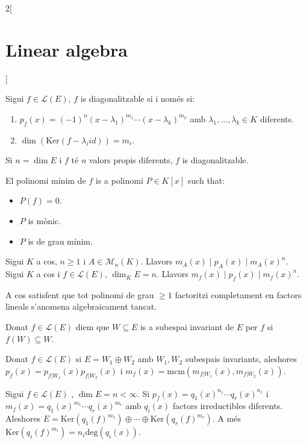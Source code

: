 \documentclass[../../../main.tex]{subfiles}
\begin{document}
\begin{multicols}{2}[\section{Linear algebra}]
\begin{theorem}
Sigui $f\in\mathcal{L}(E)$, $f$ is diagonalitzable si i només si:
\begin{enumerate}
    \item $p_f(x)=(-1)^n(x-\lambda_1)^{m_1}\cdots(x-\lambda_k)^{m_k}$ amb $\lambda_1,\ldots,\lambda_k\in K$ diferents.
    \item $\dim(\text{Ker}(f-\lambda_i id))=m_i$.
\end{enumerate}
\end{theorem}
\begin{corollary}
Si $n=\dim E$ i $f$ té $n$ valors propis diferents, $f$ is diagonalitzable.
\end{corollary}
\begin{definition}
El polinomi mínim de $f$ is a polinomi $P\in K[x]$ such that:
\begin{itemize}
    \item $P(f)=0$.
    \item $P$ is mònic.
    \item $P$ is de grau mínim.
\end{itemize}
\end{definition}
\begin{theorem}
Sigui $K$ a cos, $n\geq 1$ i $A\in\mathcal{M}_n(K)$. Llavors $m_A(x)\mid p_A(x)\mid m_A(x)^n$. Sigui $K$ a cos i $f\in\mathcal{L}(E)$, $\dim_K E=n$. Llavors $m_f(x)\mid p_f(x)\mid m_f(x)^n$. 
\end{theorem}
\begin{definition}
A cos satisfent que tot polinomi de grau $\geq 1$ factoritzi completament en factors lineals s'anomena algebraicament tancat.
\end{definition}
\begin{definition}
Donat $f\in\mathcal{L}(E)$ diem que $W\subseteq E$ is a subespai invariant de $E$ per $f$ si $f(W)\subseteq W$.
\end{definition}
\begin{lemma}
Donat $f\in\mathcal{L}(E)$ si $E=W_1\oplus W_2$ amb $W_1,W_2$ subespais invariants, aleshores $p_f(x)=p_{f|W_1}(x)p_{f|W_2}(x)$ i $m_f(x)=\text{mcm}(m_{f|W_1}(x),m_{f|W_2}(x))$.
\end{lemma}
\begin{theorem}
Sigui $f\in\mathcal{L}(E)$ , $\dim E=n<\infty$. Si $p_f(x)=q_1(x)^{n_1}\cdots q_r(x)^{n_r}$ i $m_f(x)=q_1(x)^{m_1}\cdots q_r(x)^{m_r}$ amb $q_i(x)$ factors irreductibles diferents. Aleshores $E=\text{Ker}(q_1(f)^{m_1})\oplus\cdots\oplus\text{Ker}(q_r(f)^{m_r})$. A més $\text{Ker}(q_i(f)^{m_i})=n_i\text{deg}(q_i(x))$.

\end{theorem}
\end{multicols}
\end{document}

